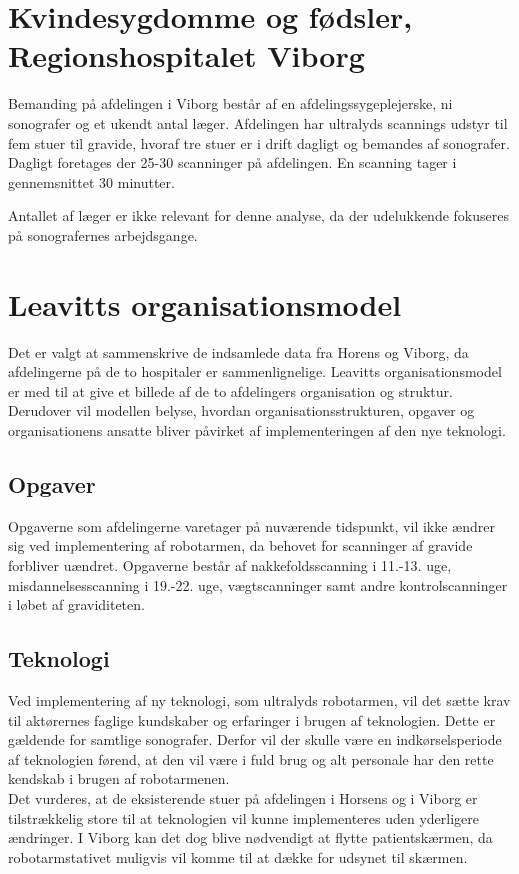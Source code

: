 \section{Kvindesygdomme og fødsler, Regionshospitalet Viborg}
Bemanding på afdelingen i Viborg består af en afdelingssygeplejerske, ni sonografer og et ukendt antal læger. Afdelingen har ultralyds scannings udstyr til fem stuer til gravide, hvoraf tre stuer er i drift dagligt og bemandes af sonografer. Dagligt foretages der 25-30 scanninger på afdelingen. En scanning tager i gennemsnittet 30 minutter.

Antallet af læger er ikke relevant for denne analyse, da der udelukkende fokuseres på sonografernes arbejdsgange.

\section{Leavitts organisationsmodel}
Det er valgt at sammenskrive de indsamlede data fra Horens og Viborg, da afdelingerne på de to hospitaler er sammenlignelige. Leavitts organisationsmodel er med til at give et billede af de to afdelingers organisation og struktur. Derudover vil modellen belyse, hvordan organisationsstrukturen, opgaver og organisationens ansatte bliver påvirket af implementeringen af den nye teknologi.


\subsection{Opgaver}
Opgaverne som afdelingerne varetager på nuværende tidspunkt, vil ikke ændrer sig ved implementering af robotarmen, da behovet for scanninger af gravide forbliver uændret. Opgaverne består af nakkefoldsscanning i 11.-13. uge, misdannelsesscanning i 19.-22. uge, vægtscanninger samt andre kontrolscanninger i løbet af graviditeten. 

\subsection{Teknologi}
Ved implementering af ny teknologi, som ultralyds robotarmen, vil det sætte krav til aktørernes faglige kundskaber og erfaringer i brugen af teknologien. Dette er gældende for samtlige sonografer. Derfor vil der skulle være en indkørselsperiode af teknologien førend, at den vil være i fuld brug og alt personale har den rette kendskab i brugen af robotarmenen. \\
Det vurderes, at de eksisterende stuer på afdelingen i Horsens og i Viborg er tilstrækkelig store til at teknologien vil kunne implementeres uden yderligere ændringer. I Viborg kan det dog blive nødvendigt at flytte patientskærmen, da robotarmstativet muligvis vil komme til at dække for udsynet til skærmen.  

